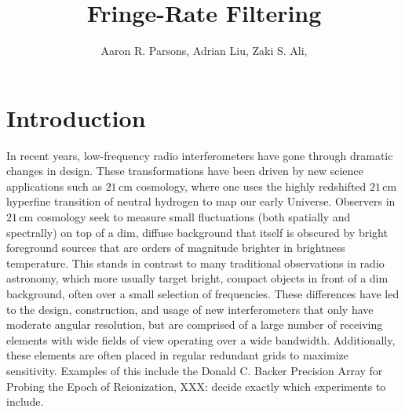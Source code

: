 \documentclass[twocolumn,apj,numberedappendix]{emulateapj}
\begin{document}
\title{Fringe-Rate Filtering}

\author{
Aaron R. Parsons,
Adrian Liu,
Zaki S. Ali,
}


\begin{abstract}
\end{abstract}




\section{Introduction}

In recent years, low-frequency radio interferometers have gone through dramatic changes in design.
These transformations have been driven by new science applications such as $21\,\textrm{cm}$
cosmology, where one uses the highly redshifted $21\,\textrm{cm}$ hyperfine transition
of neutral hydrogen to map our early Universe. Observers in $21\,\textrm{cm}$ cosmology seek to
measure small fluctuations (both spatially and spectrally) on top of a dim, diffuse background that itself is obscured by bright
foreground sources that are orders of magnitude brighter in brightness temperature. This stands
in contrast to many traditional observations in radio astronomy, which more usually target bright,
compact objects in front of a dim background, often over a small selection of frequencies. These differences have led to the design, construction, 
and usage of new interferometers that only have moderate angular resolution, but are comprised of a
large number of receiving elements with wide fields of view operating over a wide bandwidth. Additionally, these elements are often placed in regular redundant grids to maximize sensitivity. Examples of this include the Donald C. Backer Precision
Array for Probing the Epoch of Reionization, XXX: decide exactly which experiments to include.
\end{document}
